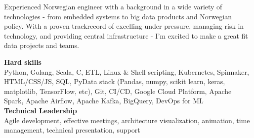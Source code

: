 \documentclass[9pt]{developercv} %
\begin{document}
\vspace{0.2cm}


\begin{minipage}[t]{0.4\textwidth} %
  Experienced Norwegian engineer with a background in a wide variety of technologies - from
  embedded systems to big data products and Norwegian policy.  With a proven
  trackrecord of excelling under pressure, managing risk in technology, and providing central infrastructure
  - I'm excited to make a great fit data projects and teams.
\end{minipage}
\hfill %
\begin{minipage}[t]{0.5\textwidth} %
  \textbf{Hard skills}\\
  Python, Golang, Scala, C, ETL, Linux \& Shell scripting, Kubernetes, Spinnaker, HTML/CSS/JS, SQL, PyData stack (Pandas, numpy, scikit learn, keras, matplotlib, TensorFlow, etc), Git, CI/CD, Google Cloud Platform, Apache Spark, Apache Airflow, Apache Kafka, BigQuery, DevOps for ML
  \\\textbf{Technical Leadership}\\
  Agile development, effective meetings, architecture visualization, animation, time management, technical presentation, support

\end{minipage}



\end{document}
